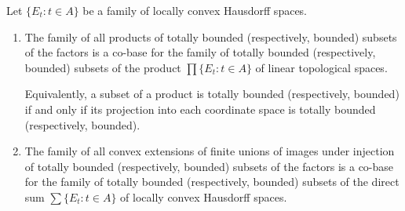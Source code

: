 Let $\{E_t : t \in A\}$ be a family of locally convex Hausdorff spaces.

\begin{enumerate}
\item[(i)] The family of all products of totally bounded (respectively, bounded) subsets of the factors is a co-base for the family of totally bounded (respectively, bounded) subsets of the product $\prod \{E_t : t \in A\}$ of linear topological spaces.

Equivalently, a subset of a product is totally bounded (respectively, bounded) if and only if its projection into each coordinate space is totally bounded (respectively, bounded).

\item[(ii)] The family of all convex extensions of finite unions of images under injection of totally bounded (respectively, bounded) subsets of the factors is a co-base for the family of totally bounded (respectively, bounded) subsets of the direct sum $\sum \{E_t : t \in A\}$ of locally convex Hausdorff spaces.
\end{enumerate}

